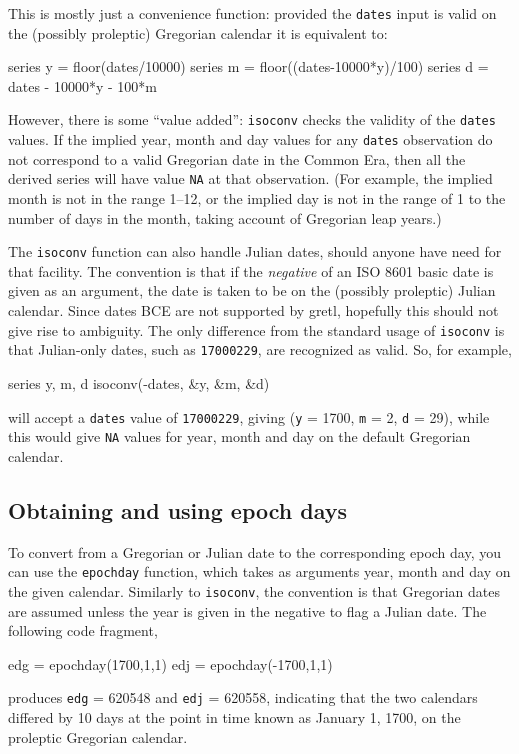 This is mostly just a convenience function: provided the
\texttt{dates} input is valid on the (possibly proleptic) Gregorian
calendar it is equivalent to:
%
\begin{code}
series y = floor(dates/10000)
series m = floor((dates-10000*y)/100)
series d = dates - 10000*y - 100*m
\end{code}

However, there is some ``value added'': \texttt{isoconv} checks the
validity of the \texttt{dates} values. If the implied year, month and
day values for any \texttt{dates} observation do not correspond to a
valid Gregorian date in the Common Era, then all the derived series
will have value \texttt{NA} at that observation. (For example, the
implied month is not in the range 1--12, or the implied day is not in
the range of 1 to the number of days in the month, taking account of
Gregorian leap years.)

The \texttt{isoconv} function can also handle Julian dates, should
anyone have need for that facility. The convention is that if the
\textit{negative} of an ISO 8601 basic date is given as an argument,
the date is taken to be on the (possibly proleptic) Julian calendar.
Since dates BCE are not supported by gretl, hopefully this should not
give rise to ambiguity. The only difference from the standard usage of
\texttt{isoconv} is that Julian-only dates, such as \texttt{17000229},
are recognized as valid. So, for example,
%
\begin{code}
series y, m, d
isoconv(-dates, &y, &m, &d)
\end{code}
%
will accept a \texttt{dates} value of \texttt{17000229}, giving
(\texttt{y} = 1700, \texttt{m} = 2, \texttt{d} = 29), while this would
give \texttt{NA} values for year, month and day on the default
Gregorian calendar.

\subsection{Obtaining and using epoch days}

To convert from a Gregorian or Julian date to the corresponding epoch
day, you can use the \texttt{epochday} function, which takes as
arguments year, month and day on the given calendar. Similarly to
\texttt{isoconv}, the convention is that Gregorian dates are assumed
unless the year is given in the negative to flag a Julian date.
The following code fragment,
%
\begin{code}
edg = epochday(1700,1,1)
edj = epochday(-1700,1,1)
\end{code}
%
produces \texttt{edg} = 620548 and \texttt{edj} = 620558, indicating
that the two calendars differed by 10 days at the point in time
known as January 1, 1700, on the proleptic Gregorian calendar.

